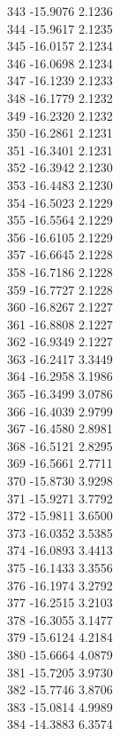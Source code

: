 \documentclass[11pt]{article}
\theoremstyle{definition}
\theoremstyle{plain}
\begin{document}
{343 -15.9076 2.1236\\
344 -15.9617 2.1235\\
345 -16.0157 2.1234\\
346 -16.0698 2.1234\\
347 -16.1239 2.1233\\
348 -16.1779 2.1232\\
349 -16.2320 2.1232\\
350 -16.2861 2.1231\\
351 -16.3401 2.1231\\
352 -16.3942 2.1230\\
353 -16.4483 2.1230\\
354 -16.5023 2.1229\\
355 -16.5564 2.1229\\
356 -16.6105 2.1229\\
357 -16.6645 2.1228\\
358 -16.7186 2.1228\\
359 -16.7727 2.1228\\
360 -16.8267 2.1227\\
361 -16.8808 2.1227\\
362 -16.9349 2.1227\\
363 -16.2417 3.3449\\
364 -16.2958 3.1986\\
365 -16.3499 3.0786\\
366 -16.4039 2.9799\\
367 -16.4580 2.8981\\
368 -16.5121 2.8295\\
369 -16.5661 2.7711\\
370 -15.8730 3.9298\\
371 -15.9271 3.7792\\
372 -15.9811 3.6500\\
373 -16.0352 3.5385\\
374 -16.0893 3.4413\\
375 -16.1433 3.3556\\
376 -16.1974 3.2792\\
377 -16.2515 3.2103\\
378 -16.3055 3.1477\\
379 -15.6124 4.2184\\
380 -15.6664 4.0879\\
381 -15.7205 3.9730\\
382 -15.7746 3.8706\\
383 -15.0814 4.9989\\
384 -14.3883 6.3574\\
}
\end{document}

